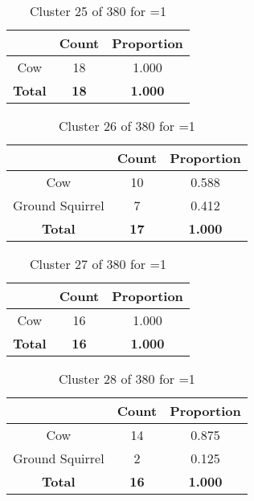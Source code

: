 \begin{table}[ht!]
\centering
\begin{tabular}{|c|c|c|}
\hline
\bf \Spec{} &\bf Count &\bf Proportion\\ \hline \hline
Cow & 18 & 1.000\\ \hline
\hline
\bf Total & \bf 18 & \bf 1.000\\ \hline
\end{tabular}
\label{tab:cluster:25:1}
\caption{Cluster 25 of 380 for \minneigh{}=1}
\end{table}

\begin{table}[ht!]
\centering
\begin{tabular}{|c|c|c|}
\hline
\bf \Spec{} &\bf Count &\bf Proportion\\ \hline \hline
Cow & 10 & 0.588\\ \hline
Ground Squirrel & 7 & 0.412\\ \hline
\hline
\bf Total & \bf 17 & \bf 1.000\\ \hline
\end{tabular}
\label{tab:cluster:26:1}
\caption{Cluster 26 of 380 for \minneigh{}=1}
\end{table}

\begin{table}[ht!]
\centering
\begin{tabular}{|c|c|c|}
\hline
\bf \Spec{} &\bf Count &\bf Proportion\\ \hline \hline
Cow & 16 & 1.000\\ \hline
\hline
\bf Total & \bf 16 & \bf 1.000\\ \hline
\end{tabular}
\label{tab:cluster:27:1}
\caption{Cluster 27 of 380 for \minneigh{}=1}
\end{table}

\begin{table}[ht!]
\centering
\begin{tabular}{|c|c|c|}
\hline
\bf \Spec{} &\bf Count &\bf Proportion\\ \hline \hline
Cow & 14 & 0.875\\ \hline
Ground Squirrel & 2 & 0.125\\ \hline
\hline
\bf Total & \bf 16 & \bf 1.000\\ \hline
\end{tabular}
\label{tab:cluster:28:1}
\caption{Cluster 28 of 380 for \minneigh{}=1}
\end{table}

